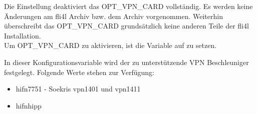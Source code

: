 \begin{description}
  Die Einstellung  deaktiviert das OPT\_VPN\_CARD vollständig. Es
  werden keine Änderungen am fli4l Archiv  bzw. dem Archiv 
  vorgenommen. Weiterhin überschreibt das OPT\_VPN\_CARD grundsätzlich keine
  anderen Teile der fli4l Installation.\\
  Um OPT\_VPN\_CARD zu aktivieren, ist die Variable  auf 
   zu setzen.


  In dieser Konfigurationsvariable wird der zu unterstützende VPN Beschleuniger
  festgelegt. Folgende Werte stehen zur Verfügung:
  \begin{itemize}
    \item hifn7751 - Soekris vpn1401 und vpn1411
    \item hifnhipp
  \end{itemize}

\end{description}
